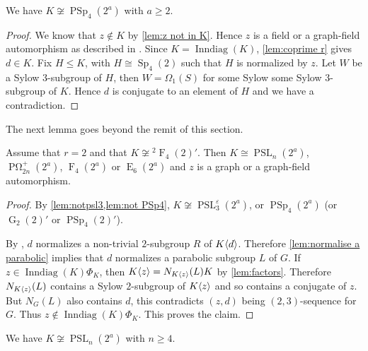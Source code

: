 \documentclass[12pt,a4paper]{amsart}
\DeclareMathOperator{\Inndiag}{Inndiag}
\DeclareMathOperator{\E}{E}
\DeclareMathOperator{\F}{F}
\DeclareMathOperator{\G}{G}
\DeclareMathOperator{\PSL}{PSL}
\DeclareMathOperator{\PSp}{PSp}
\DeclareMathOperator{\POmega}{P \Omega}
\DeclareMathOperator{\Sp}{Sp}
\renewcommand{\epsilon}{\varepsilon}
\DeclarePairedDelimiter{\gen}{\langle}{\rangle}
\begin{document}
\begin{lemma}\label{lem:not PSp4}  We have $K \not \cong \PSp_4(2^a)$ with $a \ge 2$.
\end{lemma}

\begin{proof}   We know that $z \not \in K$ by \cref{lem:z not in K}. Hence $z$ is a field or a graph-field automorphism as described in \cite[Theorem 2.5.1]{GLS3}. Since $K=\Inndiag(K)$, \cref{lem:coprime r} gives $d \in K$. Fix $H \le K$, with $H\cong  \Sp_4(2)$ such that $H$ is normalized by $z$. Let $W$ be a Sylow $3$-subgroup of $H$, then $W= \Omega_1(S)$ for some Sylow some  Sylow $3$-subgroup of $K$. Hence $d$ is conjugate to an element of $H$ and we have a contradiction.
\end{proof}

The next lemma goes beyond the remit of this section.

\begin{lemma}\label{lem:lem char 2}
Assume that $r=2$ and that $K \not \cong {}^2\F_4(2)'$.
 Then  $K\cong \PSL_n(2^a)$, $\POmega_{2n}^+(2^a)$, $\F_4(2^a)$ or $\E_6(2^a)$ and $z$ is a graph or  a graph-field automorphism.
\end{lemma}

\begin{proof}   By  \cref{lem:notpsl3,lem:not PSp4}, $K\not\cong  \PSL_3^\epsilon(2^a)$, or $\PSp_4(2^a)$ (or $\G_2(2)'$ or $\PSp_4(2)'$).

 By \cite[Theorem 1]{Gerhardt}, $d$ normalizes a non-trivial $2$-subgroup $R$ of $K\gen{d}$.
  Therefore  \cref{lem:normalise a parabolic} implies that  $d$ normalizes a parabolic subgroup $L$ of $G$.  If $z \in \Inndiag(K)\Phi_K$,  then $K\gen{z}=N_{K\gen{z}}(L)K$ by \cref {lem:factors}.
  Therefore $N_{K\gen{z}}(L)$ contains a Sylow $2$-subgroup of $K\gen{z}$ and so contains a conjugate of $z$.
  But $N_G(L)$ also contains $d$, this contradicts $(z,d)$ being $(2,3)$-sequence for $G$.
  Thus $z \not \in \Inndiag(K)\Phi_K$. This proves the claim.
\end{proof}




\begin{lemma}\label{lem:not psln}
We have $K \not \cong \PSL_n(2^a)$ with $n \ge 4$.
\end{lemma}
\end{document}
